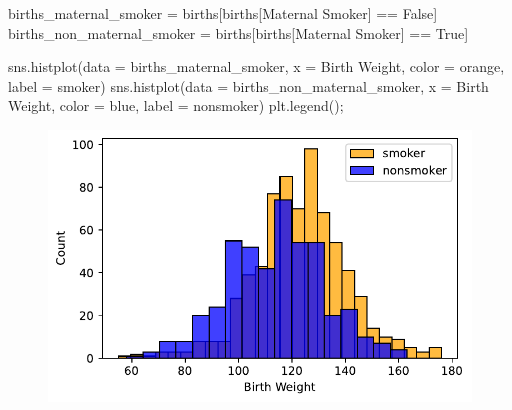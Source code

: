 \documentclass[
  letterpaper,
  DIV=11,
  numbers=noendperiod]{scrreprt}
\newenvironment{Shaded}{\begin{snugshade}}{\end{snugshade}}
\newcommand{\NormalTok}[1]{\textcolor[rgb]{0.00,0.23,0.31}{#1}}
\newcommand{\OperatorTok}[1]{\textcolor[rgb]{0.37,0.37,0.37}{#1}}
\newcommand{\StringTok}[1]{\textcolor[rgb]{0.13,0.47,0.30}{#1}}
\newcommand{\VariableTok}[1]{\textcolor[rgb]{0.07,0.07,0.07}{#1}}
\begin{document}
\begin{Shaded}
\begin{Highlighting}[]
\NormalTok{births\_maternal\_smoker }\OperatorTok{=}\NormalTok{ births[births[}\StringTok{\textquotesingle{}Maternal Smoker\textquotesingle{}}\NormalTok{] }\OperatorTok{==} \VariableTok{False}\NormalTok{]}
\NormalTok{births\_non\_maternal\_smoker }\OperatorTok{=}\NormalTok{ births[births[}\StringTok{\textquotesingle{}Maternal Smoker\textquotesingle{}}\NormalTok{] }\OperatorTok{==} \VariableTok{True}\NormalTok{]}

\NormalTok{sns.histplot(data }\OperatorTok{=}\NormalTok{ births\_maternal\_smoker, x }\OperatorTok{=} \StringTok{\textquotesingle{}Birth Weight\textquotesingle{}}\NormalTok{,}
\NormalTok{             color }\OperatorTok{=} \StringTok{\textquotesingle{}orange\textquotesingle{}}\NormalTok{, label }\OperatorTok{=} \StringTok{\textquotesingle{}smoker\textquotesingle{}}\NormalTok{)}
\NormalTok{sns.histplot(data }\OperatorTok{=}\NormalTok{ births\_non\_maternal\_smoker, x }\OperatorTok{=} \StringTok{\textquotesingle{}Birth Weight\textquotesingle{}}\NormalTok{,}
\NormalTok{             color }\OperatorTok{=} \StringTok{\textquotesingle{}blue\textquotesingle{}}\NormalTok{, label }\OperatorTok{=} \StringTok{\textquotesingle{}nonsmoker\textquotesingle{}}\NormalTok{)}
\NormalTok{plt.legend()}\OperatorTok{;}
\end{Highlighting}
\end{Shaded}

\begin{figure}[H]

{\centering \includegraphics{visualization_1/visualization_1_files/figure-pdf/cell-20-output-1.pdf}

}

\end{figure}
\end{document}
